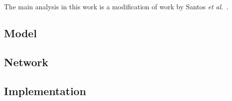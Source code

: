The main analysis in this work is a modification of work by Santos \textit{et al}.\ \cite{Santos2017}.
\subsection{Model}
\label{sec:methods_model}


\subsection{Network}
\label{sec:methods_network}


\subsection{Implementation}
\label{sec:methods_implementation}



